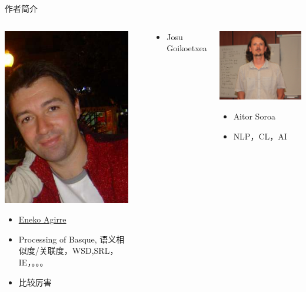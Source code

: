 \documentclass[color=usenames,dvipsnames]{beamer}
\begin{document}
\begin{frame}{作者简介}\footnotesize
  \begin{columns}
   \column{0.45\hsize}
     \begin{block}{}
   \begin{center}
     \includegraphics[width=0.35\hsize]{pic/EnekoAgirre.jpg}
   \end{center}
      \begin{itemize}
       \item \href{http://ixa2.si.ehu.es/eneko/}{Eneko Agirre}
       \item Processing of Basque, 语义相似度/关联度，WSD,SRL，IE，。。。
       \item 比较厉害
      \end{itemize}
     \end{block}

     
   \column{0.45\hsize}
   \begin{center}
   \end{center}
     \begin{block}{}
      \begin{itemize}
       \item Josu Goikoetxea
      \end{itemize}
     \end{block}
     
     \begin{block}{}
   \begin{center}
     \includegraphics[width=0.55\hsize]{pic/aitor-soroa.png}
   \end{center}
      \begin{itemize}
       \item Aitor Soroa
       \item NLP，CL，AI
      \end{itemize}
     \end{block}
  \end{columns}

\end{frame}
\end{document}
